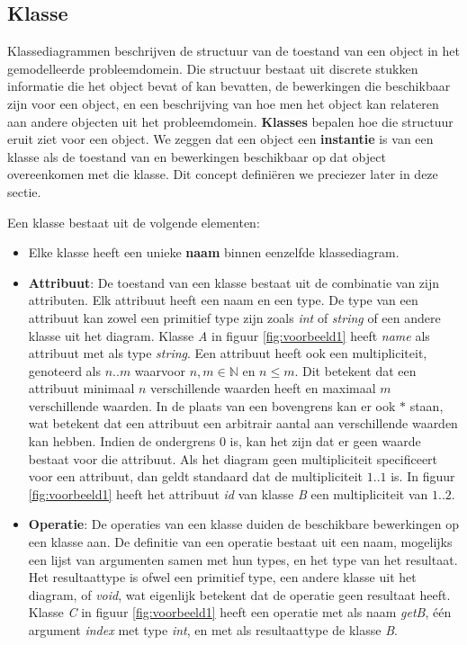 \subsection{Klasse}

Klassediagrammen beschrijven de structuur van de toestand van een object in het gemodelleerde probleemdomein. Die structuur bestaat uit discrete stukken informatie die het object bevat of kan bevatten, de bewerkingen die beschikbaar zijn voor een object, en een beschrijving van hoe men het object kan relateren aan andere objecten uit het probleemdomein. \textbf{Klasses} bepalen hoe die structuur eruit ziet voor een object. We zeggen dat een object een \textbf{instantie} is van een klasse als de toestand van en bewerkingen beschikbaar op dat object overeenkomen met die klasse. Dit concept defini\"eren we preciezer later in deze sectie.

Een klasse bestaat uit de volgende elementen:

\begin{itemize}
	\item Elke klasse heeft een unieke \textbf{naam} binnen eenzelfde klassediagram.
	\item \textbf{Attribuut}: De toestand van een klasse bestaat uit de combinatie van zijn attributen. Elk attribuut heeft een naam en een type. De type van een attribuut kan zowel een primitief type zijn zoals \textit{int} of \textit{string} of een andere klasse uit het diagram. Klasse \textit{A} in figuur \ref{fig:voorbeeld1} heeft \textit{name} als attribuut met als type \textit{string}. Een attribuut heeft ook een multipliciteit, genoteerd als $n..m$ waarvoor $n,m \in \mathbb{N}$ en $n \leq m$. Dit betekent dat een attribuut minimaal $n$ verschillende waarden heeft en maximaal $m$ verschillende waarden. In de plaats van een bovengrens kan er ook $*$ staan, wat betekent dat een attribuut een arbitrair aantal aan verschillende waarden kan hebben. Indien de ondergrens 0 is, kan het zijn dat er geen waarde bestaat voor die attribuut. Als het diagram geen multipliciteit specificeert voor een attribuut, dan geldt standaard dat de multipliciteit $1..1$ is. In figuur \ref{fig:voorbeeld1} heeft het attribuut \textit{id} van klasse \textit{B} een multipliciteit van $1..2$.
	\item \textbf{Operatie}: De operaties van een klasse duiden de beschikbare bewerkingen op een klasse aan. De definitie van een operatie bestaat uit een naam, mogelijks een lijst van argumenten samen met hun types, en het type van het resultaat. Het resultaattype is ofwel een primitief type, een andere klasse uit het diagram, of \textit{void}, wat eigenlijk betekent dat de operatie geen resultaat heeft. Klasse \textit{C} in figuur \ref{fig:voorbeeld1} heeft een operatie met als naam \textit{getB}, \'e\'en argument \textit{index} met type \textit{int}, en met als resultaattype de klasse \textit{B}.
\end{itemize}

